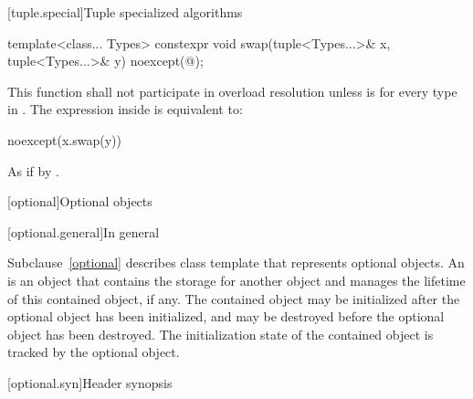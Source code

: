 [tuple.special]{Tuple specialized algorithms}

%
\begin{itemdecl}
template<class... Types>
  constexpr void swap(tuple<Types...>& x, tuple<Types...>& y) noexcept(@\seebelow@);
\end{itemdecl}

\begin{itemdescr}
\pnum
\remarks
This function shall not participate in overload resolution
unless  is 
for every type  in .
The expression inside  is equivalent to:

\begin{codeblock}
noexcept(x.swap(y))
\end{codeblock}

\pnum
\effects
As if by .
\end{itemdescr}

[optional]{Optional objects}

[optional.general]{In general}

\pnum
Subclause~\ref{optional} describes class template  that represents
optional objects.
An  is an
object that contains the storage for another object and manages the lifetime of
this contained object, if any. The contained object may be initialized after
the optional object has been initialized, and may be destroyed before the
optional object has been destroyed. The initialization state of the contained
object is tracked by the optional object.

[optional.syn]{Header  synopsis}

